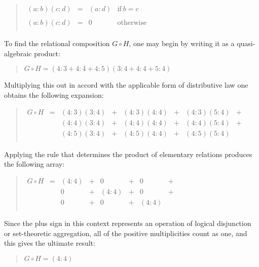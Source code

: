 \documentclass[12pt]{article}
\begin{document}
\begin{quote}$\begin{array}{lccc}
(a:b)(c:d) & = & (a:d) & \mathrm{if}\ b = c \\
\\
(a:b)(c:d) & = &   0   & \mathrm{otherwise} \\
\end{array}$\end{quote}

To find the relational composition $G \circ H$, one may begin by writing it as a quasi-algebraic product:

\begin{quote}
$G \circ H = (4\mathrm{:}3 + 4\mathrm{:}4 + 4\mathrm{:}5)(3\mathrm{:}4 + 4\mathrm{:}4 + 5\mathrm{:}4)$
\end{quote}

Multiplying this out in accord with the applicable form of distributive law one obtains the following expansion:

\begin{quote}$\begin{array}{lccccccc}
G \circ H & = & (4:3)(3:4) & + & (4:3)(4:4) & + & (4:3)(5:4) & + \\
          &   & (4:4)(3:4) & + & (4:4)(4:4) & + & (4:4)(5:4) & + \\
          &   & (4:5)(3:4) & + & (4:5)(4:4) & + & (4:5)(5:4) &   \\
\end{array}$\end{quote}

Applying the rule that determines the product of elementary relations produces the following array:

\begin{quote}$\begin{array}{lccccccc}
G \circ H & = & (4:4) & + &   0   & + &   0   & + \\
          &   &   0   & + & (4:4) & + &   0   & + \\
          &   &   0   & + &   0   & + & (4:4) &   \\
\end{array}$\end{quote}

Since the plus sign in this context represents an operation of logical disjunction or set-theoretic aggregation, all of the positive multiplicities count as one, and this gives the ultimate result:

\begin{quote}
$G \circ H = (4:4)$
\end{quote}
\end{document}
